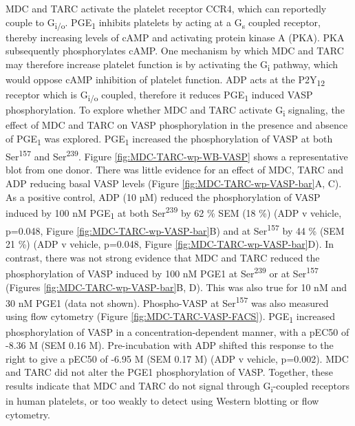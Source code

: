 \documentclass[11pt,twoside]{bristolthesis}
\begin{document}
MDC and TARC activate the platelet receptor CCR4, which can reportedly couple to G\textsubscript{i/o}. PGE\textsubscript{1} inhibits platelets by acting at a G\textsubscript{s} coupled receptor, thereby increasing levels of cAMP and activating protein kinase A (PKA). PKA subsequently phosphorylates cAMP. One mechanism by which MDC and TARC may therefore increase platelet function is by activating the G\textsubscript{i} pathway, which would oppose cAMP inhibition of platelet function. ADP acts at the P2Y\textsubscript{12} receptor which is G\textsubscript{i/o} coupled, therefore it reduces PGE\textsubscript{1} induced VASP phosphorylation. To explore whether MDC and TARC activate G\textsubscript{i} signaling, the effect of MDC and TARC on VASP phosphorylation in the presence and absence of PGE\textsubscript{1} was explored. PGE\textsubscript{1} increased the phosphorylation of VASP at both Ser\textsuperscript{157} and Ser\textsuperscript{239}. Figure \ref{fig:MDC-TARC-wp-WB-VASP} shows a representative blot from one donor. There was little evidence for an effect of MDC, TARC and ADP reducing basal VASP levels (Figure \ref{fig:MDC-TARC-wp-VASP-bar}A, C). As a positive control, ADP (10 µM) reduced the phosphorylation of VASP induced by 100 nM PGE\textsubscript{1} at both Ser\textsuperscript{239} by 62 \% SEM (18 \%) (ADP v vehicle, p=0.048, Figure \ref{fig:MDC-TARC-wp-VASP-bar}B) and at Ser\textsuperscript{157} by 44 \% (SEM 21 \%) (ADP v vehicle, p=0.048, Figure \ref{fig:MDC-TARC-wp-VASP-bar}D). In contrast, there was not strong evidence that MDC and TARC reduced the phosphorylation of VASP induced by 100 nM PGE1 at Ser\textsuperscript{239} or at Ser\textsuperscript{157} (Figures \ref{fig:MDC-TARC-wp-VASP-bar}B, D). This was also true for 10 nM and 30 nM PGE1 (data not shown). Phospho-VASP at Ser\textsuperscript{157} was also measured using flow cytometry (Figure \ref{fig:MDC-TARC-VASP-FACS}). PGE\textsubscript{1} increased phosphorylation of VASP in a concentration-dependent manner, with a pEC50 of -8.36 M (SEM 0.16 M). Pre-incubation with ADP shifted this response to the right to give a pEC50 of -6.95 M (SEM 0.17 M) (ADP v vehicle, p=0.002). MDC and TARC did not alter the PGE1 phosphorylation of VASP. Together, these results indicate that MDC and TARC do not signal through G\textsubscript{i}-coupled receptors in human platelets, or too weakly to detect using Western blotting or flow cytometry.
\end{document}
